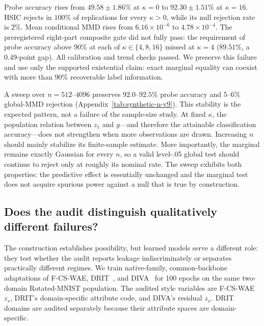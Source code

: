 \documentclass{article}
\begin{document}
Probe accuracy rises from $49.58\!\pm\!1.86\%$ at $\kappa=0$ to
$92.30\!\pm\!1.51\%$ at $\kappa=16$.  HSIC rejects in $100\%$ of replications
for every $\kappa>0$, while its null rejection rate is $2\%$.  Mean
conditional MMD rises from $6.16\times10^{-6}$ to
$4.78\times10^{-4}$.  The preregistered eight-part composite gate did not
fully pass: the requirement of probe accuracy above $90\%$ at each of
$\kappa\in\{4,8,16\}$ missed at $\kappa=4$ ($89.51\%$, a 0.49-point gap).
All calibration and trend checks passed.  We preserve this failure and use
only the supported existential claim: exact marginal equality can coexist
with more than $90\%$ recoverable label information.

A sweep over $n=512$--$4096$ preserves $92.0$--$92.5\%$ probe accuracy and
$5$--$6\%$ global-MMD rejection (Appendix~\ref{tab:synthetic-n-v9}).
This stability is the expected pattern, not a failure of the sample-size
study.  At fixed $\kappa$, the population relation between $z_1$ and $y$---and
therefore the attainable classification accuracy---does not strengthen when
more observations are drawn.  Increasing $n$ should mainly stabilize its
finite-sample estimate.  More importantly, the marginal remains exactly
Gaussian for every $n$, so a valid level-.05 global test should continue to
reject only at roughly its nominal rate.  The sweep exhibits both properties:
the predictive effect is essentially unchanged and the marginal test does not
acquire spurious power against a null that is true by construction.
\FloatBarrier

\subsection{Does the audit distinguish qualitatively different failures?}
\label{sec:cross-model}

The construction establishes possibility, but learned models serve a different
role: they test whether the audit reports leakage indiscriminately or separates
practically different regimes.  We train native-family, common-backbone adaptations of F-CS-WAE,
DRIT~\citep{lee2018drit}, and DIVA~\citep{ilse2020diva} for 100 epochs on the
same two-domain Rotated-MNIST population.  The audited style variables are
F-CS-WAE $z_s$, DRIT's domain-specific attribute code, and DIVA's residual
$z_x$.  DRIT domains are audited separately because their attribute spaces
are domain-specific.
\end{document}
